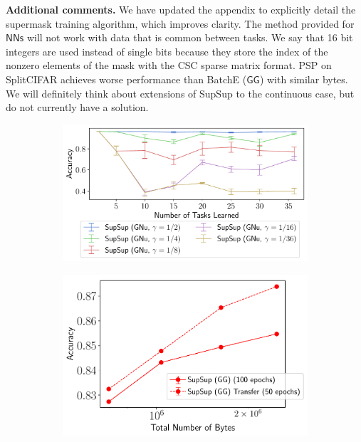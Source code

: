 \documentclass{article}
\newcommand{\casename}[1]{\ensuremath{\mathsf{#1}}\xspace}
\begin{document}
\textbf{Additional comments.} We have updated the appendix to explicitly detail the supermask training algorithm, which improves clarity. The method provided for \casename{NNs} will not work with data that is common between tasks. We say that 16 bit integers are used instead of single bits because they store the index of the nonzero elements of the mask with the CSC sparse matrix format. PSP on SplitCIFAR achieves worse performance than BatchE (\casename{GG}) with similar bytes. We will definitely think about extensions of SupSup to the continuous case, but do not currently have a solution. 

\begin{figure}
    \begin{subfigure}{0.33\textwidth}
    \centering
    \includegraphics[scale=0.33]{rebuttal/rebut.pdf}
    \end{subfigure}
    \begin{subfigure}{0.3\textwidth}
    \centering
    \includegraphics[scale=0.3]{rebuttal/estop.pdf}
    \end{subfigure}

\end{figure}
\end{document}
